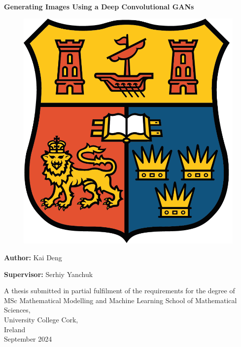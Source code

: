 \documentclass[12pt,a4paper]{report}
\begin{document}
\begin{titlepage} \vspace{1cm}

\begin{center}
\textbf{\Huge Generating Images Using a Deep Convolutional GANs}
\end{center}

\vspace{1.0cm}

\begin{figure}[h]
    \centering
    \includegraphics[scale = 0.7]{Images/UCC_logo} 
\end{figure}

\vspace{1.0cm}

\begin{center}
\textbf{\Large Author:} \Large{Kai Deng} {\LARGE\par}
\textbf{\Large Supervisor:} \Large{Serhiy Yanchuk} {\LARGE\par}
\end{center}
\vspace{1.0cm}

\begin{center}
\Large
A thesis submitted in partial fulfilment of the requirements for the degree of\\ MSc Mathematical Modelling and Machine Learning
\vfill{}
\Large{School of Mathematical Sciences, \\
University College Cork, \\
Ireland \\
\vspace{0.4cm}
September 2024}
\end{center}

\end{titlepage}
\end{document}
